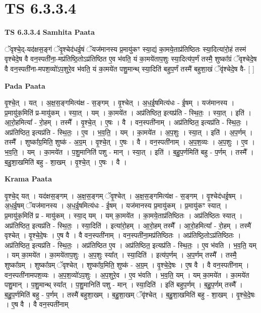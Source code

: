 \documentclass[17pt]{extarticle}
\begin{document}
\section{ TS 6.3.3.4 }

\textbf{TS 6.3.3.4 } \newline
\textbf{Samhita Paata} \newline

ॅवृश्चे॒द्-यद॑क्षस॒ङ्गं ॅवृ॒श्चेद॑धई॒षं ॅयज॑मानस्य प्र॒मायु॑कꣳ स्या॒द्यं का॒मये॒ताप्र॑तिष्ठितः स्या॒दित्या॑रो॒हं तस्म॑ वृश्चेदे॒ष वै वन॒स्पती॑ना॒-मप्र॑तिष्ठि॒तोऽप्र॑तिष्ठित ए॒व भ॑वति॒ यं का॒मये॑ताप॒शुः स्या॒दित्य॑प॒र्णं तस्मै॒ शुष्का᳚ग्रं ॅवृश्चेदे॒ष वै वन॒स्पती॑ना-मपश॒व्यो॑ऽप॒शुरे॒व भ॑वति॒ यं का॒मये॑त पशु॒मान्थ् स्या॒दिति॑ बहुप॒र्णं तस्मै॑ बहुशा॒खं ॅवृ॑श्चेदे॒ष वै- [  ] \newline

\textbf{Pada Paata} \newline

वृ॒श्चे॒त् । यत् । अ॒क्ष॒स॒ङ्गमित्य॑क्ष - स॒ङ्गम् । वृ॒श्चेत् । अ॒ध॒ई॒षमित्य॑धः - ई॒षम् । यज॑मानस्य । प्र॒मायु॑क॒मिति॑ प्र-मायु॑कम् । स्या॒त् । यम् । का॒मये॑त । अप्र॑तिष्ठित॒ इत्यप्र॑ति - स्थि॒तः॒ । स्या॒त् । इति॑ । आ॒रो॒हमित्या᳚ - रो॒हम् । तस्मै᳚ । वृ॒श्चे॒त् । ए॒षः । वै । वन॒स्पती॑नाम् । अप्र॑तिष्ठित॒ इत्यप्र॑ति - स्थि॒तः॒ । अप्र॑तिष्ठित॒ इत्यप्र॑ति - स्थि॒तः॒ । ए॒व । भ॒व॒ति॒ । यम् । का॒मये॑त । अ॒प॒शुः । स्या॒त् । इति॑ । अ॒प॒र्णम् । तस्मै᳚ । शुष्का᳚ग्र॒मिति॒ शुष्क॑ - अ॒ग्र॒म् । वृ॒श्चे॒त् । ए॒षः । वै । वन॒स्पती॑नाम् । अ॒प॒श॒व्यः । अ॒प॒शुः । ए॒व । भ॒व॒ति॒ । यम् । का॒मये॑त । प॒शु॒मानिति॑ पशु - मान् । स्या॒त् । इति॑ । ब॒हु॒प॒र्णमिति॑ बहु - प॒र्णम् । तस्मै᳚ । ब॒हु॒शा॒खमिति॑ बहु - शा॒खम् । वृ॒श्चे॒त् । ए॒षः । वै ।  \newline


\textbf{Krama Paata} \newline

वृ॒श्चे॒द् यत् । यद॑क्षस॒ङ्‍गम् । अ॒क्ष॒स॒ङ्‍गम् ॅवृ॒श्चेत् । अ॒क्ष॒स॒ङ्‍गमित्य॑क्ष - स॒ङ्‍गम् । वृ॒श्चेद॑धई॒षम् । अ॒ध॒ई॒षम् ॅयज॑मानस्य । अ॒ध॒ई॒षमित्य॑धः - ई॒षम् । यज॑मानस्य प्र॒मायु॑कम् । प्र॒मायु॑कꣳ स्यात् । प्र॒मायु॑क॒मिति॑ प्र - मायु॑कम् । स्या॒द् यम् । यम् का॒मये॑त । का॒मये॒ताप्र॑तिष्ठितः । अप्र॑तिष्ठितः स्यात् । अप्र॑तिष्ठित॒ इत्यप्र॑ति - स्थि॒तः॒ । स्या॒दिति॑ । इत्या॑रो॒हम् । आ॒रो॒हम् तस्मै᳚ । आ॒रो॒हमित्या᳚ - रो॒हम् । तस्मै॑ वृश्चेत् । वृ॒श्चे॒दे॒षः । ए॒ष वै । वै वन॒स्पती॑नाम् । वन॒स्पती॑ना॒मप्र॑तिष्ठितः । अप्र॑तिष्ठि॒तोऽप्र॑तिष्ठितः । अप्र॑तिष्ठित॒ इत्यप्र॑ति - स्थि॒तः॒ । अप्र॑तिष्ठित ए॒व । अप्र॑तिष्ठित॒ इत्यप्र॑ति - स्थि॒तः॒ । ए॒व भ॑वति । भ॒व॒ति॒ यम् । यम् का॒मये॑त । का॒मये॑ताप॒शुः । अ॒प॒शुः स्या᳚त् । स्या॒दिति॑ । इत्य॑प॒र्णम् । अ॒प॒र्णम् तस्मै᳚ । तस्मै॒ शुष्का᳚ग्रम् । शुष्का᳚ग्रम् ॅवृश्चेत् । शुष्का᳚ग्र॒मिति॒ शुष्क॑ - अ॒ग्र॒म् । वृ॒श्चे॒दे॒षः । ए॒ष वै । वै वन॒स्पती॑नाम् । वन॒स्पती॑नामपश॒व्यः । अ॒प॒श॒व्यो॑ऽप॒शुः । अ॒प॒शुरे॒व । ए॒व भ॑वति । भ॒व॒ति॒ यम् । यम् का॒मये॑त । का॒मये॑त पशु॒मान् । प॒शु॒मान्थ् स्या᳚त् । प॒शु॒मानिति॑ पशु - मान् । स्या॒दिति॑ । इति॑ बहुप॒र्णम् । ब॒हु॒प॒र्णम् तस्मै᳚ । ब॒हु॒प॒र्णमिति॑ बहु - प॒र्णम् । तस्मै॑ बहुशा॒खम् । ब॒हु॒शा॒खम् ॅवृ॑श्चेत् । ब॒हु॒शा॒खमिति॑ बहु - शा॒खम् । वृ॒श्चे॒दे॒षः । ए॒ष वै । वै वन॒स्पती॑नाम् \newline
\end{document}
